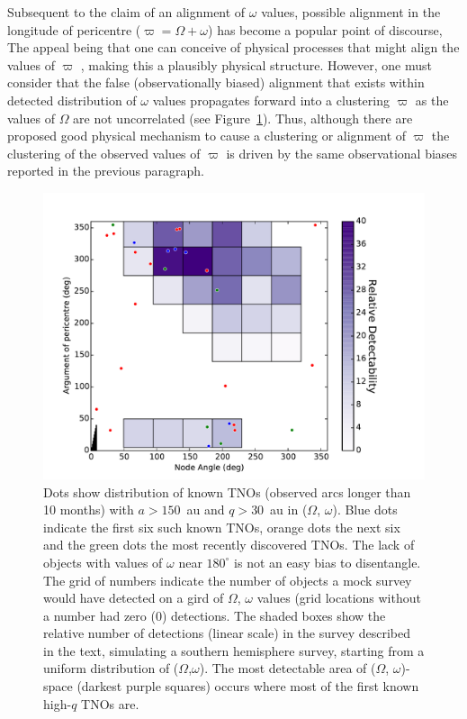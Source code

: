 \documentclass[preprint]{aastex62}
\begin{document}
Subsequent to the claim of an alignment of $\omega$ values, possible
alignment in the longitude of pericentre ($\varpi=\Omega+\omega$) has become
a popular point of discourse,  The appeal being that one can conceive
of physical processes that might align the values of $\varpi$ \citep[e.g.][]{batyginbrown16},
making this a plausibly physical structure.  However, one must
consider that the false (observationally biased) alignment that exists within detected distribution of $\omega$ values
propagates forward into a clustering $\varpi$ as the values of
$\Omega$ are not uncorrelated (see Figure~\ref{fig:bias_jj}).  Thus, although there
are proposed good physical mechanism to cause a clustering or alignment of
$\varpi$ the clustering of the observed values of
$\varpi$ is driven by the same observational biases reported
in the previous paragraph.

\begin{figure}
\centering
\includegraphics[width=\textwidth]{figure2.pdf}
\caption{Dots show distribution of known TNOs (observed arcs longer than 10 months) with $a > 150$~au and $q > 30$~au in ($\Omega$, $\omega$).  Blue dots indicate the first six such known TNOs, orange dots the next six and the green dots the most recently discovered TNOs.  The lack of objects with values of $\omega$ near $180^{\circ}$ is not an easy bias to disentangle.  The grid of numbers indicate the number of objects a mock survey would have detected on a gird of $\Omega$, $\omega$ values (grid locations without a number had zero (0) detections.  
The shaded boxes show the relative number of detections (linear scale) in the survey described in the text, simulating a southern hemisphere survey, starting from a uniform distribution of ($\Omega$,$\omega$).
The most detectable area of ($\Omega$, $\omega$)-space (darkest purple squares) occurs where most of the first known high-$q$ TNOs are. }
\label{fig:bias_jj}
\end{figure}
\end{document}
